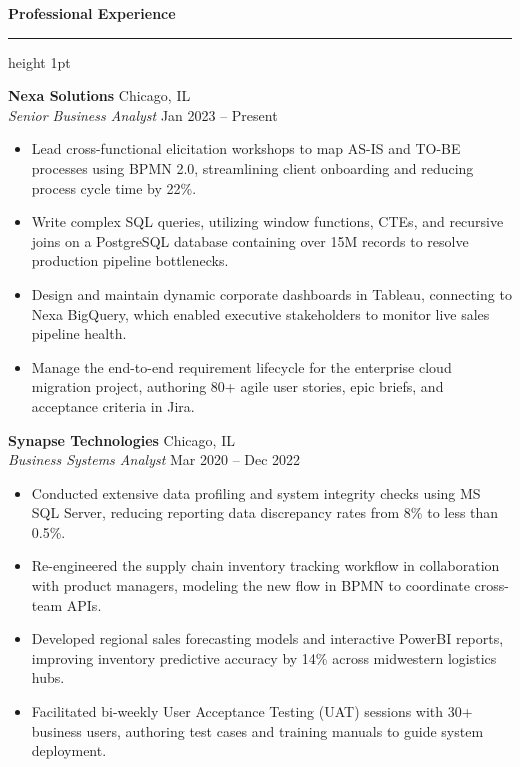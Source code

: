 \documentclass[10pt]{article}
\newcommand{\ressection}[1]{%
  \vspace{0.8em}%
  {\large\bfseries\color{primary} #1}%
  \vspace{0.2em}%
  {\color{accent}\hrule height 1pt}%
  \vspace{0.5em}%
}
\newcommand{\jobentry}[4]{%
  {\bfseries\color{textdark} #1} \hfill {\color{secondary}\small #2} \\
  {\itshape\color{accent} #3} \hfill {\color{secondary}\small #4} \\
  \vspace{0.2em}%
}
\begin{document}
\begin{minipage}[t]{0.62\textwidth}
  \ressection{Professional Experience}
  
  \jobentry{Nexa Solutions}{Chicago, IL}{Senior Business Analyst}{Jan 2023 -- Present}
  \begin{itemize}[leftmargin=1.1em, topsep=0pt, itemsep=0.25em, parsep=0pt]
    \item Lead cross-functional elicitation workshops to map AS-IS and TO-BE processes using BPMN 2.0, streamlining client onboarding and reducing process cycle time by 22\%.
    \item Write complex SQL queries, utilizing window functions, CTEs, and recursive joins on a PostgreSQL database containing over 15M records to resolve production pipeline bottlenecks.
    \item Design and maintain dynamic corporate dashboards in Tableau, connecting to Nexa BigQuery, which enabled executive stakeholders to monitor live sales pipeline health.
    \item Manage the end-to-end requirement lifecycle for the enterprise cloud migration project, authoring 80+ agile user stories, epic briefs, and acceptance criteria in Jira.
  \end{itemize}
  
  \vspace{0.8em}
  
  \jobentry{Synapse Technologies}{Chicago, IL}{Business Systems Analyst}{Mar 2020 -- Dec 2022}
  \begin{itemize}[leftmargin=1.1em, topsep=0pt, itemsep=0.25em, parsep=0pt]
    \item Conducted extensive data profiling and system integrity checks using MS SQL Server, reducing reporting data discrepancy rates from 8\% to less than 0.5\%.
    \item Re-engineered the supply chain inventory tracking workflow in collaboration with product managers, modeling the new flow in BPMN to coordinate cross-team APIs.
    \item Developed regional sales forecasting models and interactive PowerBI reports, improving inventory predictive accuracy by 14\% across midwestern logistics hubs.
    \item Facilitated bi-weekly User Acceptance Testing (UAT) sessions with 30+ business users, authoring test cases and training manuals to guide system deployment.
  \end{itemize}
  
  \vspace{0.8em}
  

\end{minipage}
\end{document}
